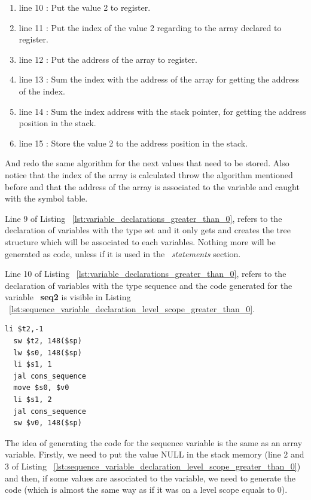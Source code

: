 \documentclass[
  oneside,
  11pt, a4paper,
  footinclude=true,
  headinclude=true,
  cleardoublepage=empty
]{scrbook}
\begin{document}
\begin{enumerate}
\item line 10 : Put the value 2 to register.
\item line 11 : Put the index of the value 2 regarding to the array declared to register.
\item line 12 : Put the address of the array to register.
\item line 13 : Sum the index with the address of the array for getting the address of the index.
\item line 14 : Sum the index address with the stack pointer, for getting the address position in the stack.
\item line 15 : Store the value 2 to the address position in the stack.
\end{enumerate}

And redo the same algorithm for the next values that need to be stored. Also notice that the index of the array is calculated throw the algorithm mentioned before and that the address of the array is associated to the variable and caught with the symbol table.

Line 9 of Listing ~\ref{lst:variable_declarations_greater_than_0}, refers to the declaration of variables with the type set and it only gets and creates the tree structure which will be associated to each variables. Nothing more will be generated as code, unless if it is used in the ~\textit{statements} section.

Line 10 of Listing ~\ref{lst:variable_declarations_greater_than_0}, refers to the declaration of variables with the type sequence and the code generated for the variable ~\textbf{seq2} is visible in Listing ~\ref{lst:sequence_variable_declaration_level_scope_greater_than_0}.

\begin{lstlisting}[caption={Declaring sequence variable in level scope greater than 0},label={lst:sequence_variable_declaration_level_scope_greater_than_0}]
  li $t2,-1		
  sw $t2, 148($sp)		
  lw $s0, 148($sp)	
  li $s1, 1		
  jal cons_sequence		
  move $s0, $v0		
  li $s1, 2		
  jal cons_sequence		
  sw $v0, 148($sp)		
\end{lstlisting}

The idea of  generating the code for the sequence variable is the same as an array variable.
Firstly, we need to put the value NULL in the stack memory (line 2 and 3 of Listing ~\ref{lst:sequence_variable_declaration_level_scope_greater_than_0}) and then, if some values are associated to the variable, we need to generate the code (which is almost the same way as if it was on a level scope equals to 0).
\end{document}
